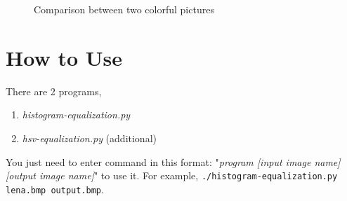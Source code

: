 \documentclass[12pt,twoside,a4paper]{article}
\newcommand{\inlinecode}[1]{\colorbox{backcolour}{\color{darkgray}\texttt{#1}}}
\begin{document}
\begin{figure}[H]
\centering
{}
\hfill
{}
\caption{Comparison between two colorful pictures}
\end{figure}

\section{How to Use}
There are 2 programs,
\begin{enumerate}
    \item \textit{histogram-equalization.py}
    \item \textit{hsv-equalization.py} (additional)
\end{enumerate}
You just need to enter command in this format: "\textit{program [input image name] [output image name]}" to use it. For example, \inlinecode{./histogram-equalization.py lena.bmp output.bmp}.
\end{document}
